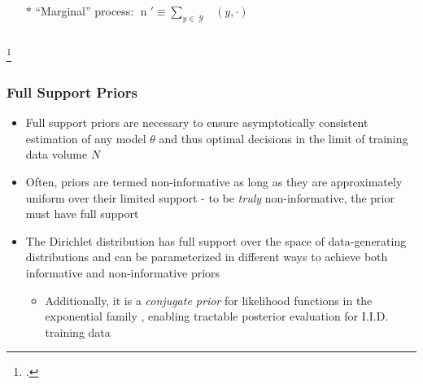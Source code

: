 \documentclass[aspectratio=169,usenames,dvipsnames]{beamer}
\DeclareMathOperator{\nrm}{\mathrm{n}}
\DeclareMathOperator{\nbarrm}{\bar{\mathrm{n}}}
\DeclareMathOperator{\Ycal}{\mathcal{Y}}
\begin{document}
\begin{frame}
\begin{columns}[c]
\begin{column}{.5\linewidth}
\vspace{1em}
\begin{itemize}
\item[$*$] ``Marginal'' process: $\nrm' \equiv \sum_{y \in \Ycal} \nbarrm(y,\cdot)$ 
\end{itemize}


\end{column}

\end{columns}

\footcitetext{bernardo}

\end{frame}





\begin{frame}
\frametitle{Full Support Priors}

\begin{itemize}
\item Full support priors are necessary to ensure \alert{asymptotically consistent} estimation of any model $\theta$ and thus optimal decisions in the limit of training data volume $N$
\vspace{0.5em}
\item Often, priors are termed non-informative as long as they are approximately uniform over their limited support - to be \emph{truly} non-informative, the prior must have full support
\vspace{0.5em}
\item The \alert{Dirichlet distribution} has full support over the space of data-generating distributions and can be parameterized in different ways to achieve both informative and non-informative priors
	\vspace{0.25em}
	\begin{itemize}
	\item Additionally, it is a \emph{conjugate prior} for likelihood functions in the exponential family , enabling tractable posterior evaluation for I.I.D. training data
	\end{itemize}
\end{itemize}

\end{frame}
\end{document}
